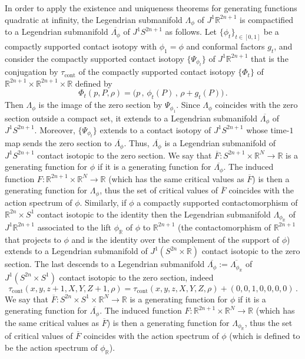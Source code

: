 \documentclass{amsart}
\DeclareMathOperator{\cont}{cont}
\theoremstyle{remark}
\begin{document}
In order to apply the existence and uniqueness theorems
for generating functions quadratic at infinity,
the Legendrian submanifold $\Lambda_{\phi}$
of $J^1\mathbb{R}^{2n+1}$
is compactified to a Legendrian submanifold
$\overline{\Lambda_{\phi}}$ of $J^1S^{2n+1}$
as follows.
Let $\{\phi_t\}_{t \in [0,1]}$
be a compactly supported contact isotopy with $\phi_1 = \phi$
and conformal factors $g_t$,
and consider the compactly supported contact isotopy
$\{\Psi_{\phi_t}\}$ of $J^1 \mathbb{R}^{2n+1}$
that is the conjugation by $\tau_{\cont}$
of the compactly supported contact isotopy
$\{\Phi_t\}$ of $\mathbb{R}^{2n+1} \times \mathbb{R}^{2n+1} \times \mathbb{R}$
defined by
\[
\Phi_t (p, P, \rho)
= \big( p \,,\, \phi_t (P) \,,\, \rho + g_t (P) \big) \,.
\]
Then $\Lambda_{\phi}$ is the image of the zero section by $\Psi_{\phi_1}$.
Since $\Lambda_{\phi}$ coincides with the zero section
outside a compact set,
it extends to a Legendrian submanifold
$\overline{\Lambda_{\phi}}$ of $J^1 S^{2n+1}$.
Moreover,
$\{ \Psi_{\phi_t} \}$ extends to a contact isotopy of $J^1S^{2n+1}$
whose time-$1$ map sends the zero section to $\overline{\Lambda_{\phi}}$.
Thus, $\overline{\Lambda_{\phi}}$ is a Legendrian submanifold of $J^1S^{2n+1}$
contact isotopic to the zero section.
We say that $\overline{F}: S^{2n+1} \times \mathbb{R}^N \rightarrow \mathbb{R}$
is a generating function for $\phi$
if it is a generating function for $\overline{\Lambda_{\phi}}$.
The induced function
$F: \mathbb{R}^{2n+1} \times \mathbb{R}^N \rightarrow \mathbb{R}$
(which has the same critical values as $\overline{F}$)
is then a generating function for $\Lambda_{\phi}$,
thus the set of critical values of $\overline{F}$
coincides with the action spectrum of $\phi$.
Similarly,
if $\phi$ a compactly supported contactomorphism
of $\mathbb{R}^{2n} \times S^1$
contact isotopic to the identity
then the Legendrian submanifold $\Lambda_{\phi_{\mathbb{R}}}$
of $J^1\mathbb{R}^{2n+1}$
associated to the lift $\phi_{\mathbb{R}}$
of $\phi$ to $\mathbb{R}^{2n+1}$
(the contactomorphism of $\mathbb{R}^{2n+1}$
that projects to $\phi$
and is the identity over the complement of the support of $\phi$)
extends to a Legendrian submanifold of $J^1 (S^{2n} \times \mathbb{R})$
contact isotopic to the zero section.
The last descends to a Legendrian submanifold
$\overline{\Lambda_{\phi}} := \overline{\Lambda_{\phi_{\mathbb{R}}}}$
of $J^1 (S^{2n} \times S^1)$
contact isotopic to the zero section,
indeed
\[
\tau_{\cont} (x, y, z+1, X, Y, Z+1, \rho)
= \tau_{\cont} (x, y, z, X, Y, Z, \rho) + (0, 0, 1, 0, 0, 0, 0) \,.
\]
We say that
$\overline{F}: S^{2n} \times S^1 \times \mathbb{R}^N \rightarrow \mathbb{R}$
is a generating function for $\phi$
if it is a generating function for $\overline{\Lambda_{\phi}}$.
The induced function
$F: \mathbb{R}^{2n+1} \times \mathbb{R}^N \rightarrow \mathbb{R}$
(which has the same critical values as $\overline{F}$)
is then a generating function for $\Lambda_{\phi_{\mathbb{R}}}$,
thus the set of critical values of $\overline{F}$
coincides with the action spectrum of $\phi$
(which is defined to be the action spectrum of $\phi_{\mathbb{R}}$).
\end{document}
